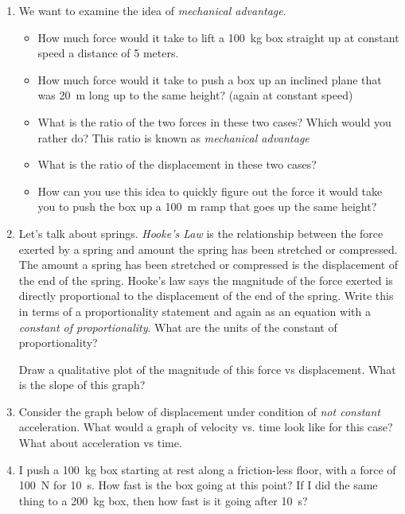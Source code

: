 \begin{enumerate}
\item 
We want to examine the idea of \emph{mechanical advantage}. 

\begin{itemize}
	\setlength\itemsep{1 in}
	\item How much force would it take to lift a \SI{100}{kg} box straight up at constant speed a distance of 5 meters.
	\item How much force would it take to push a box up an inclined plane that was \SI{20}{\meter} long up to the same height? (again at constant speed)
	\item What is the ratio of the two forces in these two cases? Which would you rather do? This ratio is known as \emph{mechanical advantage}
	\item What is the ratio of the displacement in these two cases?
	\item How can you use this idea to quickly figure out the force it would take you to push the box up a \SI{100}{\meter} ramp that goes up the same height?
\end{itemize}\hugeskip



\item Let's talk about springs. \emph{Hooke's Law} is the relationship between the force exerted by a spring and amount the spring has been stretched or compressed. The amount a spring has been stretched or compressed is the displacement of the end of the spring. Hooke's law says the magnitude of the force exerted is directly proportional to the displacement of the end of the spring. Write this in terms of a proportionality statement and again as an equation with a \emph{constant of proportionality}. What are the units of the constant of proportionality?\bigskip

Draw a qualitative plot of the magnitude of this force vs displacement. What is the slope of this graph?\hugeskip

\item Consider the graph below of displacement under condition of \emph{not constant} acceleration. What would a graph of velocity vs. time look like for this case? What about acceleration vs time. 



\item
I push a \SI{100}{kg} box starting at rest along a friction-less floor, with a force of \SI{100}{\newton} for \SI{10}{\second}. How fast is the box going at this point? If I did the same thing to a \SI{200}{kg} box, then how fast is it going after \SI{10}{s}?
\hugeskip


\end{enumerate}
